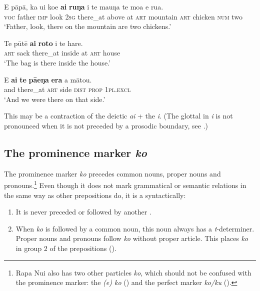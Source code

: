 \ea\label{ex:4.308}
\gll E pāpā, ka u{\ꞌ}i koe \textbf{{\ꞌ}ai} \textbf{ruŋa} i te ma{\ꞌ}uŋa te moa e rua. \\
\textsc{voc} father \textsc{imp} look \textsc{2sg} there\_at above at \textsc{art} mountain \textsc{art} chicken \textsc{num} two \\

\glt 
‘Father, look, there on the mountain are two chickens.’ \textstyleExampleref{[R104.052]} 
\z

\ea\label{ex:4.309}
\gll Te pūtē \textbf{{\ꞌ}ai} \textbf{roto} i te hare. \\
\textsc{art} sack there\_at inside at \textsc{art} house \\

\glt 
‘The bag is there inside the house.’ \textstyleExampleref{[R333.349]} 
\z

\ea\label{ex:4.310}
\gll {\ꞌ}E \textbf{{\ꞌ}ai} \textbf{te} \textbf{pā{\ꞌ}eŋa} \textbf{era} a mātou. \\
and there\_at \textsc{art} side \textsc{dist} \textsc{prop} \textsc{1pl.excl} \\

\glt
‘And we were there on that side.’ \textstyleExampleref{[R623.047]}
\z

This  may be a contraction of the deictic  \textit{{\ꞌ}ai} + the  \textit{{\ꞌ}i}. (The glottal in \textit{{\ꞌ}i} is not pronounced when it is not preceded by a prosodic boundary, see .) 
\subsection{The prominence marker \textit{ko}}\label{sec:4.7.11}
The prominence marker \textit{ko} precedes common nouns, proper nouns and pronouns.\footnote{\label{fn:240}Rapa Nui also has two other particles \textit{ko}, which should not be confused with the prominence marker: the  \textit{(e) ko} () and the perfect marker \textit{ko/ku} ().}  Even though it does not mark grammatical or semantic relations in the same way as other prepositions do, it is a  syntactically:

\begin{enumerate}
\item 
It is never preceded or followed by another . 

\item 
When \textit{ko} is followed by a common noun, this noun always has a \textit{t}{}-determiner. Proper nouns and pronouns follow \textit{ko} without proper article. This places \textit{ko} in group 2 of the prepositions ().

\end{enumerate}

